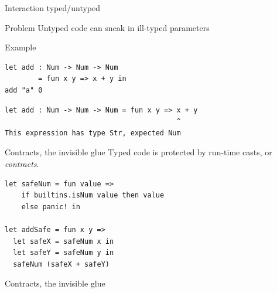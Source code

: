 \documentclass[a4paper]{beamer}
\begin{document}
\begin{frame}[fragile]{Interaction typed/untyped}

\begin{alertblock}{Problem}
Untyped code can sneak in ill-typed parameters
\end{alertblock}

\vspace{10pt}

\begin{exampleblock}{Example}
\begin{lstlisting}[language=Nickel]
let add : Num -> Num -> Num
        = fun x y => x + y in
add "a" 0
\end{lstlisting}

\begin{lstlisting}[language=Terminal,style=Terminal]
let add : Num -> Num -> Num = fun x y => x + y
                                         ^
This expression has type Str, expected Num
\end{lstlisting}
\end{exampleblock}
\end{frame}

\begin{frame}[fragile]{Contracts, the invisible glue}
Typed code is protected by run-time casts, or \emph{contracts}.

\vspace{10pt}

\begin{lstlisting}[language=Nickel,title={Generated code for \lstinline+add+}]
let safeNum = fun value =>
    if builtins.isNum value then value
    else panic! in

let addSafe = fun x y =>
  let safeX = safeNum x in
  let safeY = safeNum y in
  safeNum (safeX + safeY)
\end{lstlisting}
\end{frame}

\begin{frame}{Contracts, the invisible glue}
\end{frame}
\end{document}

